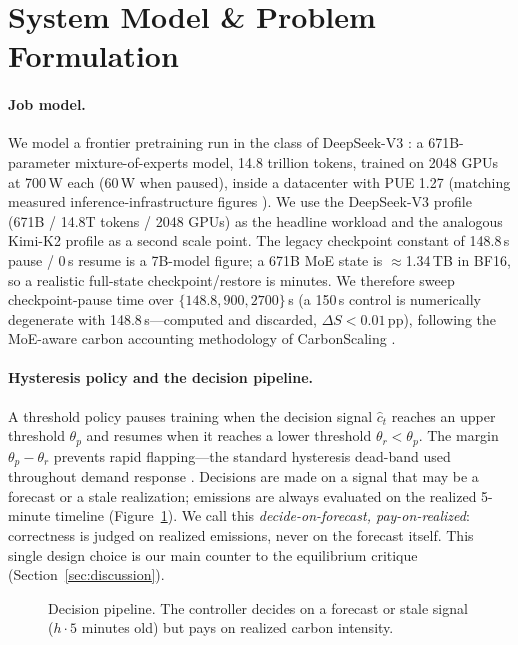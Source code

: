 \documentclass[sigconf,nonacm=false]{acmart}
\begin{document}
\section{System Model \& Problem Formulation}
\label{sec:model}

\paragraph{Job model.}
We model a frontier pretraining run in the class of DeepSeek-V3
\cite{deepseek2024v3}: a 671B-parameter mixture-of-experts model, 14.8 trillion
tokens, trained on 2048 GPUs at 700\,W each (60\,W when paused), inside a
datacenter with PUE 1.27 (matching measured inference-infrastructure figures
\cite{jegham2025hungry}). We use the DeepSeek-V3 profile
(671B / 14.8T tokens / 2048 GPUs) as the headline workload and the analogous
Kimi-K2 profile \cite{kimi2025k2} as a second scale point. The legacy checkpoint
constant of 148.8\,s pause / 0\,s resume is a 7B-model figure; a 671B MoE state
is $\approx$1.34\,TB in BF16, so a realistic full-state checkpoint/restore is
minutes. We therefore sweep checkpoint-pause time over
$\{148.8, 900, 2700\}$\,s (a 150\,s control is numerically degenerate with
148.8\,s---computed and discarded, $\Delta S<0.01$\,pp), following the MoE-aware
carbon accounting
methodology of CarbonScaling \cite{jiang2025carbonscaling}.

\paragraph{Hysteresis policy and the decision pipeline.}
A threshold policy pauses training when the decision signal $\hat{c}_t$ reaches
an upper threshold $\theta_p$ and resumes when it reaches a lower threshold
$\theta_r < \theta_p$. The margin $\theta_p - \theta_r$ prevents rapid
flapping---the standard hysteresis dead-band used throughout demand response
\cite{perfumo2011tcl}. Decisions are made on a signal that may be a forecast or
a stale realization; emissions are always evaluated on the realized 5-minute
timeline (Figure~\ref{fig:loop}). We call this \emph{decide-on-forecast,
pay-on-realized}: correctness is judged on realized emissions, never on the
forecast itself. This single design choice is our main counter to the
equilibrium critique \cite{jiang2026equilibrium} (Section~\ref{sec:discussion}).

\begin{figure}[t]
  \centering
  \newcommand{\paperstandaloneinputsentinel}{}
  \resizebox{\columnwidth}{!}{}
  \caption{Decision pipeline. The controller decides on a forecast or stale
  signal ($h\cdot5$ minutes old) but pays on realized carbon intensity.}
  \label{fig:loop}
\end{figure}
\end{document}
